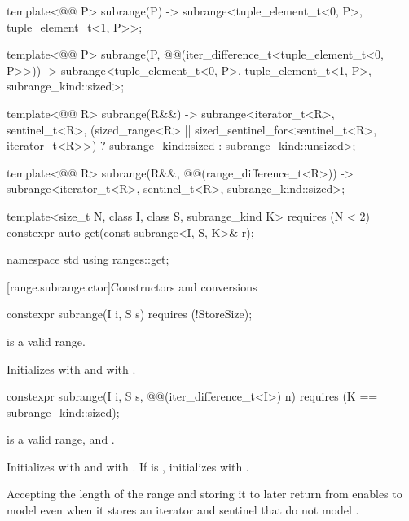 \begin{codeblock}
{  template<@@ P>
    subrange(P) -> subrange<tuple_element_t<0, P>, tuple_element_t<1, P>>;

  template<@@ P>
    subrange(P, @@(iter_difference_t<tuple_element_t<0, P>>)) ->
      subrange<tuple_element_t<0, P>, tuple_element_t<1, P>, subrange_kind::sized>;

  template<@@ R>
    subrange(R&&) ->
      subrange<iterator_t<R>, sentinel_t<R>,
               (sized_range<R> || sized_sentinel_for<sentinel_t<R>, iterator_t<R>>)
                 ? subrange_kind::sized : subrange_kind::unsized>;

  template<@@ R>
    subrange(R&&, @@(range_difference_t<R>)) ->
      subrange<iterator_t<R>, sentinel_t<R>, subrange_kind::sized>;

  template<size_t N, class I, class S, subrange_kind K>
    requires (N < 2)
  constexpr auto get(const subrange<I, S, K>& r);
}

namespace std {
  using ranges::get;
}
\end{codeblock}

[range.subrange.ctor]{Constructors and conversions}

%
\begin{itemdecl}
constexpr subrange(I i, S s) requires (!StoreSize);
\end{itemdecl}

\begin{itemdescr}
\pnum
\expects
{} is a valid range.

\pnum
\effects
Initializes  with  and  with
.
\end{itemdescr}

%
\begin{itemdecl}
constexpr subrange(I i, S s, @@(iter_difference_t<I>) n)
  requires (K == subrange_kind::sized);
\end{itemdecl}

\begin{itemdescr}
\pnum
\expects
{} is a valid range, and
.

\pnum
\effects
Initializes  with  and  with
. If  is , initializes  with
.

\pnum
\begin{note}
Accepting the length of the range and storing it to later return  from
 enables  to model  even
when it stores an iterator and sentinel that do not model
.
\end{note}
\end{itemdescr}


